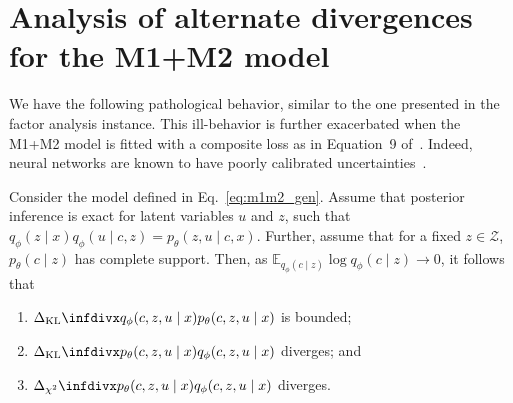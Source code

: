 \section{Analysis of alternate divergences for the M1+M2 model}
\label{app:m1m2}
We have the following pathological behavior, similar to the one presented in the factor analysis instance. This ill-behavior is further exacerbated when the M1+M2 model is fitted with a composite loss as in Equation~9 of~\cite{KingmaRMW14}. Indeed, neural networks are known to have poorly calibrated uncertainties~\cite{pmlr-v70-guo17a}.
\begin{prop}
\label{prop:M1M2}
Consider the model defined in Eq.~\eqref{eq:m1m2_gen}. Assume that posterior inference is exact for latent variables $u$ and $z$, such that $q_\phi(z \mid x)q_\phi(u \mid c, z) = p_\theta(z, u \mid c, x)$. Further, assume that for a fixed $z \in \mathcal{Z}$, $p_\theta(c \mid z)$ has complete support. Then, as $\mathbb{E}_{q_\phi(c \mid z)}\log q_\phi(c \mid z) \rightarrow 0$, it follows that
\begin{enumerate}
    \item $\kl{q_\phi(c, z, u \mid x)}{p_\theta(c, z, u \mid x)}$ is bounded;
    \item $\kl{p_\theta(c, z, u \mid x)}{q_\phi(c, z, u \mid x)}$ diverges; and
    \item $\chidiv{p_\theta(c, z, u \mid x)}{q_\phi(c, z, u \mid x)}$ diverges.
\end{enumerate}
\end{prop}
